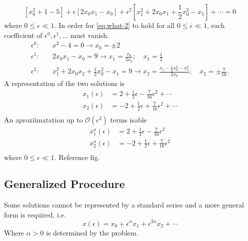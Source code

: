 \documentclass[12pt,twoside]{article}
\begin{document}
\begin{equation}
  \label{eq:what-2}
  [x_0^2+1-5]+\epsilon[2x_0x_1-x_0] + \epsilon^2[x_1^2+2x_0x_1+\frac{1}{2}x_0^2-x_1] + \cdots = 0
\end{equation}
where $0\le\epsilon\ll1$. In order for \cref{eq:what-2} to hold for all
$0\le\epsilon\ll1$, each coefficient of $\epsilon^0,\epsilon^1,\ldots$ must
vanish.
\begin{equation*}
  \begin{aligned}
    \epsilon^0:&\quad x^2-4=0\longrightarrow x_0=\pm 2 \\
    \epsilon^1:&\quad 2x_0x_1-x_0=9\longrightarrow x_1=\frac{x_0}{2x_0};\quad x_1=\frac{1}{2} \\
    \epsilon^2:&\quad x_1^2+2x_0x_2+\frac{1}{2}x_0^2-x_1=9\longrightarrow x_2=\frac{x_1-\frac{1}{2}x_0^2-x_1^2}{2x_0};\quad x_2=\pm\frac{7}{16}.
  \end{aligned}
\end{equation*}
A representation of the two solutions is
\begin{equation*}
  \begin{aligned}
    x_1(\epsilon) &= 2 + \frac{1}{2}\epsilon - \frac{7}{16}\epsilon^2 + \cdots \\
    x_2(\epsilon) &= -2 + \frac{1}{2}\epsilon + \frac{7}{16}\epsilon^2 + \cdots \\
  \end{aligned}
\end{equation*}
An aproxiimatation up to $\mathcal{O}(\epsilon^2)$ terms isable
\begin{equation*}
  \begin{aligned}
    x_1^a(\epsilon) & = 2+\frac{1}{2}\epsilon - \frac{7}{16}\epsilon^2\\
    x_2^a(\epsilon) & = -2+\frac{1}{2}\epsilon + \frac{7}{16}\epsilon^2\\
  \end{aligned}
\end{equation*}
where $0\le\epsilon\ll1$. Reference fig.

\subsection{Generalized Procedure}
Some solutions cannot be represented by a standard series and a more general
form is required, i.e.
\begin{equation*}
  x(\epsilon) = x_0+\epsilon^{\alpha}x_1 + \epsilon^{2\alpha}x_2 + \cdots
\end{equation*}
Where $\alpha>0$ is determined by the problem.
\end{document}
